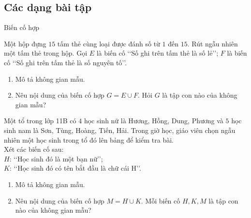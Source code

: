 \subsection{Các dạng bài tập}
\begin{dang}{Biến cố hợp}
\end{dang}
\begin{vd}%
	Một hộp đựng $15$ tấm thẻ cùng loại được đánh số từ $1$ đến $15$. Rút ngẫu nhiên một tấm thẻ trong hộp. Gọi $E$ là biến cố \lq\lq Số ghi trên tấm thẻ là số lẻ\rq\rq; $F$ là biến cố \lq\lq Số ghi trên tấm thẻ là số nguyên tố\rq\rq.
	\begin{enumerate}
		\item Mô tả không gian mẫu.
		\item Nêu nội dung của biến cố hợp $G=E \cup F$. Hỏi $G$ là tập con nào của không gian mẫu?
	\end{enumerate}
\end{vd}
\begin{vd}%
	Một tổ trong lớp 11B có $4$ học sinh nữ là Hương, Hồng, Dung, Phương và $5$ học sinh nam là Sơn, Tùng, Hoàng, Tiến, Hải. Trong giờ học, giáo viên chọn ngẫu nhiên một học sinh trong tổ đó lên bảng để kiểm tra bài.\\
	Xét các biến cố sau:\\
	$H$: \lq\lq Học sinh đó là một bạn nữ\rq\rq;\\
	$K$: \lq\lq Học sinh đó có tên bắt đầu là chữ cái $\mathrm{H}$\rq\rq.
	\begin{enumerate}
		\item Mô tả không gian mẫu.
		\item Nêu nội dung của biến cố hợp $M=H \cup K$. Mỗi biến cố $H, K, M$ là tập con nào của không gian mẫu?
	\end{enumerate}
\end{vd}
